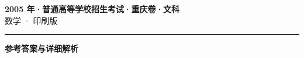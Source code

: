 \documentclass[zihao=5, a4paper]{ctexart}
\begin{document}
\begin{center}
  {\Large\bfseries 2005 年·普通高等学校招生考试·重庆卷·文科}\\[4pt]
  {\large 数学 · 印刷版}
\end{center}
\medskip
{}

\par\bigskip\hrule\bigskip
{}
\begin{center}{\large\bfseries 参考答案与详细解析}\end{center}
\smallskip

\end{document}
